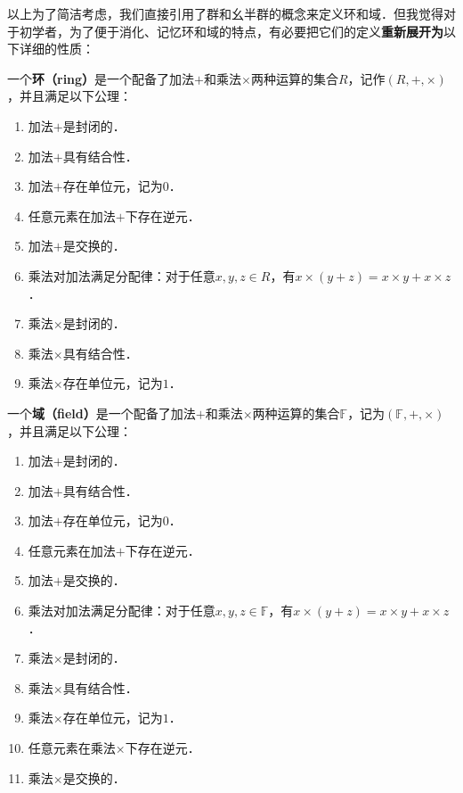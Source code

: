 以上为了简洁考虑，我们直接引用了群和幺半群的概念来定义环和域．但我觉得对于初学者，为了便于消化、记忆环和域的特点，有必要把它们的定义\textbf{重新展开为}以下详细的性质：

\begin{definition}{}
一个\textbf{环（ring）}是一个配备了加法$+$和乘法$\times$两种运算的集合$R$，记作$(R, +, \times)$，并且满足以下公理：
\begin{enumerate}
    \item 加法$+$是封闭的．
    \item 加法$+$具有结合性．
    \item 加法$+$存在单位元，记为$0$．
    \item 任意元素在加法$+$下存在逆元．
    \item 加法$+$是交换的．
    \item 乘法对加法满足分配律：对于任意$x, y, z\in R$，有$x\times(y+z)=x\times y+x\times z$．
    \item 乘法$\times$是封闭的．
    \item 乘法$\times$具有结合性．
    \item 乘法$\times$存在单位元，记为$1$．
\end{enumerate}
\end{definition}

\begin{definition}{}
一个\textbf{域（field）}是一个配备了加法$+$和乘法$\times$两种运算的集合$\mathbb{F}$，记为$(\mathbb{F}, +, \times)$，并且满足以下公理：

\begin{enumerate}
    \item 加法$+$是封闭的．
    \item 加法$+$具有结合性．
    \item 加法$+$存在单位元，记为$0$．
    \item 任意元素在加法$+$下存在逆元．
    \item 加法$+$是交换的．
    \item 乘法对加法满足分配律：对于任意$x, y, z\in \mathbb{F}$，有$x\times(y+z)=x\times y+x\times z$．
    \item 乘法$\times$是封闭的．
    \item 乘法$\times$具有结合性．
    \item 乘法$\times$存在单位元，记为$1$．
    \item 任意元素在乘法$\times$下存在逆元．
    \item 乘法$\times$是交换的．
\end{enumerate}
\end{definition}

